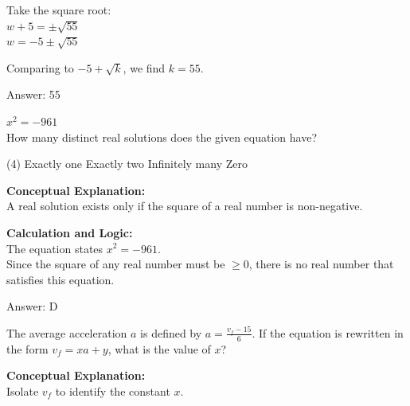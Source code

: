 \documentclass[11pt,paper=a4,answers]{exam}
\begin{document}
\begin{questions}
\begin{solution}
\vspace{10pt}

Take the square root: \\
$w + 5 = \pm \sqrt{55}$ \\
$w = -5 \pm \sqrt{55}$

\vspace{10pt}

Comparing to $-5 + \sqrt{k}$, we find $k = 55$.

\vspace{25pt}

Answer: \colorbox{yellow!100}{55}
\end{solution}

\vspace{40pt}

\question
$x^2 = -961$ \\
How many distinct real solutions does the given equation have?
\begin{tasks}(4)
    \task Exactly one
    \task Exactly two
    \task Infinitely many
    \task Zero
\end{tasks}

\begin{solution}
\textbf{Conceptual Explanation:} \\
A real solution exists only if the square of a real number is non-negative.

\vspace{20pt}

\textbf{Calculation and Logic:} \\
The equation states $x^2 = -961$. \\
Since the square of any real number must be $\ge 0$, there is no real number that satisfies this equation.

\vspace{25pt}

Answer: \colorbox{yellow!100}{D}
\end{solution}

\vspace{40pt}

\question
The average acceleration $a$ is defined by $a = \frac{v_f - 15}{6}$. If the equation is rewritten in the form $v_f = xa + y$, what is the value of $x$?

\begin{solution}
\textbf{Conceptual Explanation:} \\
Isolate $v_f$ to identify the constant $x$.


\end{solution}
\end{questions}
\end{document}
